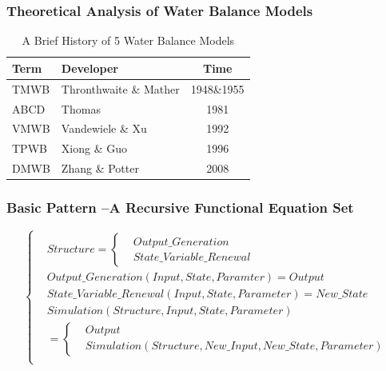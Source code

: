 \documentclass{beamer}
\begin{document}
\begin{frame}
\frametitle{Theoretical Analysis of Water Balance Models}
\begin{table}[H]
\caption{A Brief History of 5 Water Balance Models}
\begin{center}
\begin{tabular}{llc}
\toprule
Term  & Developer & Time  \\
\midrule
TMWB      & Thronthwaite \& Mather    & 1948\&1955      \\
ABCD      & Thomas     & 1981      \\
VMWB      & Vandewiele \& Xu     & 1992      \\
TPWB      & Xiong \& Guo     & 1996      \\
DMWB      & Zhang \& Potter      & 2008       \\
\bottomrule
\end{tabular}
\end{center}
\end{table}
\end{frame}

\begin{frame}
\frametitle{Basic Pattern --A Recursive Functional Equation Set}
\begin{equation*}
\left\{
\begin{aligned}
   &Structure=\left\{\begin{aligned}&Output\_Generation\\&State\_Variable\_Renewal\end{aligned}\right.\\
   &Output\_Generation (Input,State,Paramter)=Output  \\
   &State\_Variable\_Renewal (Input,State,Parameter)=New\_State\\
   &Simulation(Structure,Input,State,Parameter)\\&=\left\{\begin{aligned}&Output\\&Simulation(Structure, New\_Input,New\_State,Parameter) \end{aligned}\right.\\
\end{aligned}
\right.
\end{equation*} 
\end{frame}
\end{document}
